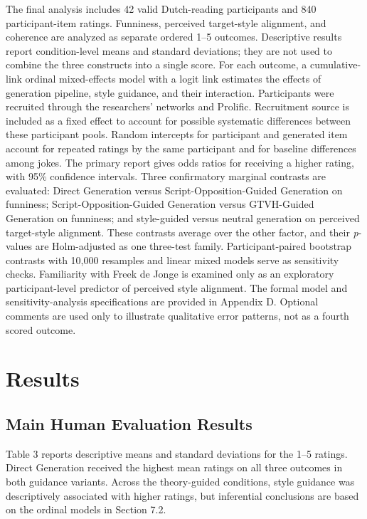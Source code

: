 \documentclass[11pt]{article}
\begin{document}
The final analysis includes 42 valid Dutch-reading participants and 840 participant-item ratings. Funniness, perceived target-style alignment, and coherence are analyzed as separate ordered 1--5 outcomes. Descriptive results report condition-level means and standard deviations; they are not used to combine the three constructs into a single score. For each outcome, a cumulative-link ordinal mixed-effects model with a logit link estimates the effects of generation pipeline, style guidance, and their interaction. Participants were recruited through the researchers' networks and Prolific. Recruitment source is included as a fixed effect to account for possible systematic differences between these participant pools. Random intercepts for participant and generated item account for repeated ratings by the same participant and for baseline differences among jokes. The primary report gives odds ratios for receiving a higher rating, with 95\% confidence intervals. Three confirmatory marginal contrasts are evaluated: Direct Generation versus Script-Opposition-Guided Generation on funniness; Script-Opposition-Guided Generation versus GTVH-Guided Generation on funniness; and style-guided versus neutral generation on perceived target-style alignment. These contrasts average over the other factor, and their \emph{p}-values are Holm-adjusted as one three-test family. Participant-paired bootstrap contrasts with 10,000 resamples and linear mixed models serve as sensitivity checks. Familiarity with Freek de Jonge is examined only as an exploratory participant-level predictor of perceived style alignment. The formal model and sensitivity-analysis specifications are provided in Appendix D. Optional comments are used only to illustrate qualitative error patterns, not as a fourth scored outcome.

\section{Results}\label{results}

\subsection{Main Human Evaluation Results}\label{main-human-evaluation-results}

Table 3 reports descriptive means and standard deviations for the 1--5 ratings. Direct Generation received the highest mean ratings on all three outcomes in both guidance variants. Across the theory-guided conditions, style guidance was descriptively associated with higher ratings, but inferential conclusions are based on the ordinal models in Section 7.2.
\end{document}
